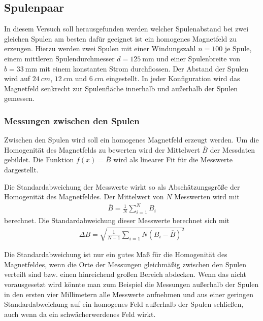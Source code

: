 \subsection{Spulenpaar}
In diesem Versuch soll herausgefunden werden welcher Spulenabstand bei zwei gleichen Spulen
am besten dafür geeignet ist ein homogenes Magnetfeld zu erzeugen.
Hierzu werden zwei Spulen mit einer Windungszahl $n= 100$ je Spule, einem mittleren Spulendurchmesser $d = \qty{125}{\mm}$
und einer Spulenbreite von $b = \qty[]{33}{\mm}$ mit einem konstanten Strom durchflossen.
Der Abstand der Spulen wird auf $\qty[]{24}{cm}$, $\qty[]{12}{cm}$ und $\qty[]{6}{cm}$ eingestellt.
In jeder Konfiguration wird das Magnetfeld senkrecht zur Spulenfläche innerhalb und außerhalb der Spulen gemessen.

\subsubsection{Messungen zwischen den Spulen}
Zwischen den Spulen wird soll ein homogenes Magnetfeld erzeugt werden.
Um die Homogenität des Magnetfelds zu bewerten wird der Mittelwert $\overline{B}$ der Messdaten gebildet.
Die Funktion $f(x) = \overline{B}$  wird als linearer Fit für die Messwerte dargestellt.





Die Standardabweichung der Messwerte wirkt so als Abschätzungsgröße der Homogenität des Magnetfeldes.
Der Mittelwert von $N$ Messwerten wird mit
\begin{align}
    \overline{B} = \frac{1}{N} \sum_{i=1}^{N} B_{i}
\end{align} 
berechnet.
Die Standardabweichung dieser Messwerte berechnet sich mit
\begin{align}
    \Delta B = \sqrt{\frac{1}{N-1} \sum_{i=1}{N}\left(B_{i}- \overline{B}\right)^2}
\end{align}

Die Standardabweichung ist nur ein gutes Maß für die Homogenität des Magnetfeldes, 
wenn die Orte der Messungen gleichmäßig zwischen den Spulen verteilt sind bzw. einen hinreichend großen Bereich abdecken.
Wenn das nicht vorausgesetzt wird könnte man zum Beispiel die Messungen außerhalb der Spulen in den ersten vier Millimetern
alle Messwerte aufnehmen und aus einer geringen Standardabweichung auf ein homogenes Feld außerhalb der Spulen schließen,
auch wenn da ein schwächerwerdenes Feld wirkt.


